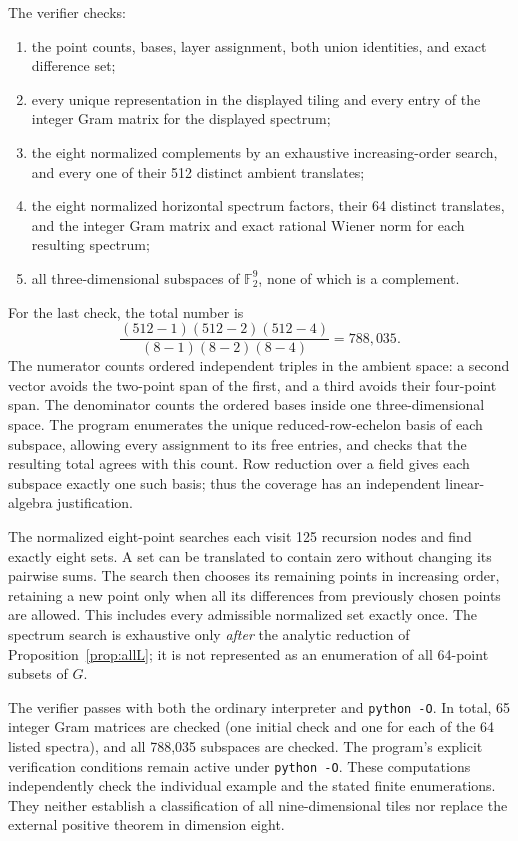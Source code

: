 \documentclass[11pt]{article}
\numberwithin{equation}{section}
\theoremstyle{definition}
\theoremstyle{remark}\newtheorem{remark}[theorem]{Remark}
\newcommand{\F}{\mathbb F_2}
\begin{document}
The verifier checks:
\begin{enumerate}
\item the point counts, bases, layer assignment, both union identities,
and exact difference set;
\item every unique representation in the displayed tiling and every
entry of the integer Gram matrix for the displayed spectrum;
\item the eight normalized complements by an exhaustive increasing-order
search, and every one of their 512 distinct ambient translates;
\item the eight normalized horizontal spectrum factors, their 64 distinct
translates, and the integer Gram matrix and exact rational Wiener norm
for each resulting spectrum;
\item all three-dimensional subspaces of $\F^9$, none of which is a
complement.
\end{enumerate}
For the last check, the total number is
\[
 \frac{(512-1)(512-2)(512-4)}{(8-1)(8-2)(8-4)}=788{,}035.
\]
The numerator counts ordered independent triples in the ambient space:
a second vector avoids the two-point span of the first, and a third
avoids their four-point span. The denominator counts the ordered bases
inside one three-dimensional space. The program enumerates the unique
reduced-row-echelon basis of each subspace, allowing every assignment to
its free entries, and checks that the resulting total agrees with this
count. Row reduction over a field gives each subspace exactly one such
basis; thus the coverage has an independent linear-algebra justification.

The normalized eight-point searches each visit 125 recursion nodes and
find exactly eight sets. A set can be translated to contain zero without
changing its pairwise sums. The search then chooses its remaining points
in increasing order, retaining a new point only when all its differences
from previously chosen points are allowed. This includes every admissible
normalized set exactly once. The spectrum search is exhaustive only
\emph{after} the analytic reduction of Proposition~\ref{prop:allL}; it
is not represented as an enumeration of all 64-point subsets of $G$.

The verifier passes with both the ordinary interpreter and \texttt{python -O}. In total,
65 integer Gram matrices are checked (one initial check and one for each
of the 64 listed spectra), and all 788,035 subspaces are checked. The
program's explicit verification conditions remain active under
\texttt{python -O}. These computations independently check the individual
example and the stated finite enumerations. They neither establish a
classification of all nine-dimensional tiles nor replace the external
positive theorem in dimension eight.
\end{document}
